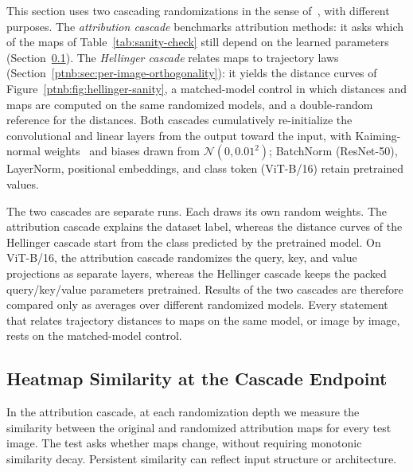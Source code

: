 This section uses two cascading randomizations in the sense of~\textcite{Adebayo2018sanity}, with different purposes. The \emph{attribution cascade} benchmarks attribution methods: it asks which of the maps of Table~\ref{tab:sanity-check} still depend on the learned parameters (Section~\ref{ptnb:app:sanity-heatmap}). The \emph{Hellinger cascade} relates maps to trajectory laws (Section~\ref{ptnb:sec:per-image-orthogonality}): it yields the distance curves of Figure~\ref{ptnb:fig:hellinger-sanity}, a matched-model control in which distances and maps are computed on the same randomized models, and a double-random reference for the distances. Both cascades cumulatively re-initialize the convolutional and linear layers from the output toward the input, with Kaiming-normal weights~\parencite{He2015delving} and biases drawn from $\mathcal{N}(0, 0.01^2)$; BatchNorm (ResNet-50), LayerNorm, positional embeddings, and class token (ViT-B/16) retain pretrained values.

The two cascades are separate runs. Each draws its own random weights. The attribution cascade explains the dataset label, whereas the distance curves of the Hellinger cascade start from the class predicted by the pretrained model. On ViT-B/16, the attribution cascade randomizes the query, key, and value projections as separate layers, whereas the Hellinger cascade keeps the packed query/key/value parameters pretrained. Results of the two cascades are therefore compared only as averages over different randomized models. Every statement that relates trajectory distances to maps on the same model, or image by image, rests on the matched-model control.

\subsection{Heatmap Similarity at the Cascade Endpoint}\label{ptnb:app:sanity-heatmap}

In the attribution cascade, at each randomization depth we measure the similarity between the original and randomized attribution maps for every test image. The test asks whether maps change, without requiring monotonic similarity decay. Persistent similarity can reflect input structure or architecture.


